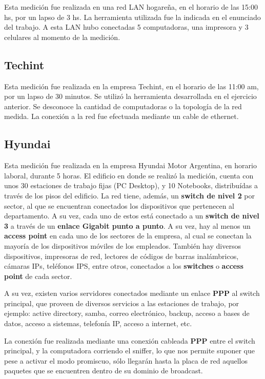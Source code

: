 \documentclass[final,inline,a4paper,narroweqnarray]{ieee}
\let\Oldsubsection\subsection
\renewcommand{\subsection}{\FloatBarrier\Oldsubsection}
\begin{document}
  Esta medición fue realizada en una red LAN hogareña, en el
  horario de las 15:00 hs, por un lapso de 3 hs. La herramienta
  utilizada fue la indicada en el enunciado del trabajo. A esta LAN
  hubo conectadas 5 computadoras, una impresora y 3 celulares al
  momento de la medición.

\subsection{Techint}

  Esta medición fue realizada en la empresa Techint, en el horario de
  las 11:00 am, por un lapso de 30 minutos. Se utilizó la herramienta
  desarrollada en el ejercicio anterior. Se desconoce la cantidad de
  computadoras o la topología de la red medida. La conexión a la red
  fue efectuada mediante un cable de ethernet.


\subsection{Hyundai}

  Esta medición fue realizada en la empresa Hyundai Motor Argentina,
  en horario laboral, durante 5 horas. El edificio en donde se realizó
  la medición, cuenta con unos 30 estaciones de trabajo fijas (PC
  Desktop), y 10 Notebooks, distribuídas a través de los pisos del
  edificio. La red tiene, además, un \textbf{switch de nivel 2} por
  sector, al que se encuentran conectados los dispositivos que
  pertenecen al departamento. A su vez, cada uno de estos está
  conectado a un \textbf{switch de nivel 3} a través de un
  \textbf{enlace Gigabit punto a punto}. A su vez, hay al menos un
  \textbf{access point} en cada uno de los sectores de la empresa, al
  cual se conectan la mayoría de los dispositivos móviles de los
  empleados. También hay diversos dispositivos, impresoras de red,
  lectores de códigos de barras inalámbricos, cámaras IPs, teléfonos
  IPS, entre otros, conectados a los
  \textbf{switches} o \textbf{access point} de cada sector.

  A su vez, existen varios servidores conectados mediante un enlace
  \textbf{PPP} al switch principal, que proveen de diversos servicios a las
  estaciones de trabajo, por ejemplo: active directory, samba, correo
  electrónico, backup, acceso a bases de datos, acceso a sistemas,
  telefonía IP, acceso a internet, etc.

  La conexión fue realizada mediante una conexión cableada
  \textbf{PPP} entre el switch principal, y la computadora corriendo
  el sniffer, lo que nos permite suponer que pese a activar el modo
  promiscuo, sólo llegarán hasta la placa de red aquellos paquetes que
  se encuentren dentro de su dominio de broadcast.
\end{document}
